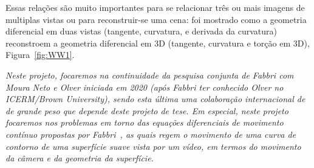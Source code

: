 \documentclass[a4paper,titlepage]{article}
\begin{document}
Essas relações são muito importantes para se relacionar três ou mais imagens 
de multiplas vistas ou para reconstruir-se uma cena: foi mostrado como 
a geometria diferencial em duas vistas (tangente, curvatura, e
derivada da curvatura) reconstroem a geometria diferencial em 3D (tangente,
curvatura e torção em 3D), Figura~\ref{fig:WW1}.

{\em
  Neste projeto, focaremos na continuidade da pesquisa conjunta de Fabbri com
  Moura Neto e Olver iniciada em 2020 (após Fabbri ter conhecido Olver no
  ICERM/Brown University), sendo esta última uma colaboração internacional de
  de grande peso que depende deste projeto de tese. Em especial, neste projeto focaremos nos problemas em
torno das equações diferenciais de movimento contínuo propostas por Fabbri~\cite{fabbri2016multiview},
as quais regem o movimento de uma curva de contorno de uma superfície suave vista por
um vídeo, em termos do movimento da câmera e da geometria da superfície.}
\end{document}
